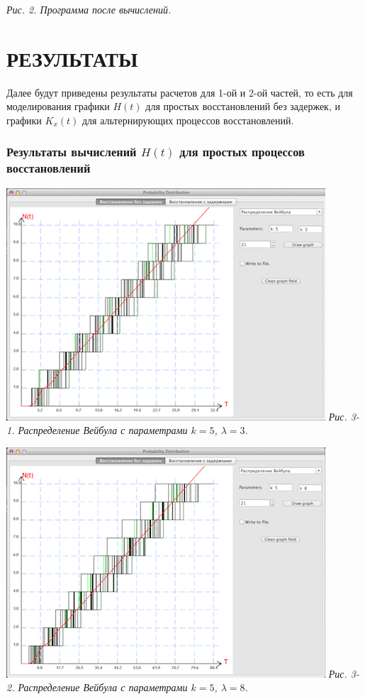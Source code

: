 \textit{Рис. 2. Программа после вычислений.}

\chapter*{РЕЗУЛЬТАТЫ}

Далее будут приведены результаты расчетов для 1-ой и 2-ой частей, то есть для моделирования графики $H(t)$ для простых восстановлений без задержек, и графики $K_x(t)$ для альтернирующих процессов восстановлений.

\begin{center}
\item\subsection{Результаты вычислений $H(t)$ для простых процессов восстановлений}
\end{center}

\includegraphics{3-1.png} 
\textit{Рис. 3-1. Распределение Вейбула с параметрами $k = 5$, $\lambda = 3$.}

\includegraphics{3-2.png} 
\textit{Рис. 3-2. Распределение Вейбула с параметрами $k = 5$, $\lambda = 8$.}

